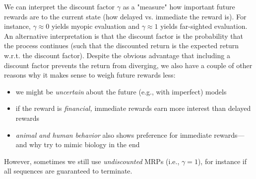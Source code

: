 			We can interpret the discount factor \(\gamma\) as a "measure" how important future rewards are to the current state (how delayed vs. immediate the reward is). For instance, \(\gamma \approx 0\) yields myopic evaluation and \(\gamma \approx 1\) yields far-sighted evaluation. An alternative interpretation is that the discount factor is the probability that the process continues (such that the discounted return is the expected return w.r.t. the discount factor). Despite the obvious advantage that including a discount factor prevents the return from diverging, we also have a couple of other reasons why it makes sense to weigh future rewards less:
			\begin{itemize}
				\item we might be \emph{uncertain} about the future (e.g., with imperfect) models
				\item if the reward is \emph{financial,} immediate rewards earn more interest than delayed rewards
				\item \emph{animal and human behavior} also shows preference for immediate rewards---and why try to mimic biology in the end
			\end{itemize}
			However, sometimes we still use \emph{undiscounted} \acp{MRP} (i.e., \( \gamma = 1 \)), for instance if all sequences are guaranteed to terminate.

